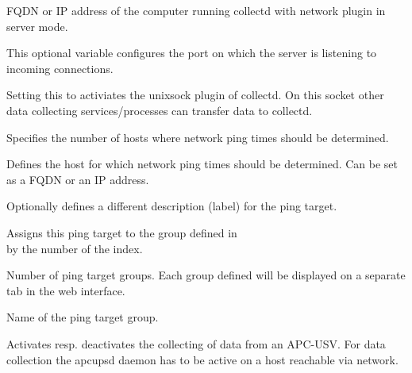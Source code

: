 \begin{description}

  FQDN or IP address of the computer running collectd with network plugin in
  server mode.


  This optional variable configures the port on which the server is listening
  to incoming connections.


  Setting this to  activiates the unixsock plugin of collectd.
  On this socket other data collecting services/processes can transfer
  data to collectd.


  Specifies the number of hosts where network ping times should
  be determined.


  Defines the host for which network ping times should be determined.
  Can be set as a FQDN or an IP address.


  Optionally defines a different description (label) for the ping target.


  Assigns this ping target to the group defined in\\
   by the number of the index.


  Number of ping target groups. Each group defined will be displayed on a
  separate tab in the web interface.


  Name of the ping target group.


  Activates resp. deactivates the collecting of data from an APC-USV.
  For data collection the apcupsd daemon has to be active on a host
  reachable via network.


\end{description}
